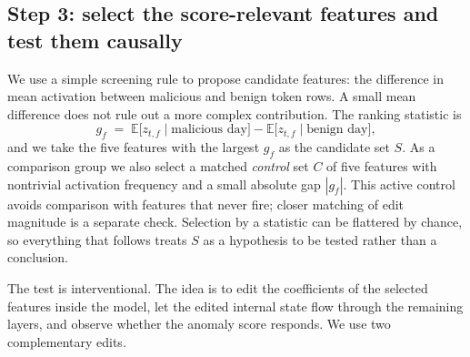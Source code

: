 \documentclass[10pt]{article} %
\begin{document}
\subsection{Step 3: select the score-relevant features and test them
causally}
\label{sec:interventions}

We use a simple screening rule to propose candidate features: the
difference in mean activation between malicious and benign token rows.
A small mean difference does not rule out a more complex contribution.
The ranking statistic is
\begin{equation}
g_f \;=\; \mathbb{E}\bigl[z_{t,f} \mid \text{malicious day}\bigr] -
\mathbb{E}\bigl[z_{t,f} \mid \text{benign day}\bigr],
\end{equation}
and we take the five features with the largest $g_f$ as the candidate set
$S$. As a comparison group we also select a matched \emph{control} set
$C$ of five features with nontrivial activation frequency and a small
absolute gap $|g_f|$. This active control avoids comparison with features
that never fire; closer matching of edit magnitude is a separate check. Selection by a statistic can be
flattered by chance, so everything that follows treats $S$ as a
hypothesis to be tested rather than a conclusion.

The test is interventional. The idea is to edit the coefficients of the
selected features inside the model, let the edited internal state flow
through the remaining layers, and observe whether the anomaly score
responds. We use two complementary edits.
\end{document}
